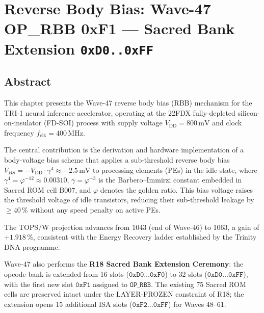 
\chapter{Reverse Body Bias: Wave-47 OP\_RBB 0xF1 — Sacred Bank Extension
  \texttt{0xD0..0xFF}}
\label{ch:rbb-w47}

\section{Abstract}
\label{sec:abstract-w47}

This chapter presents the Wave-47 reverse body bias (RBB) mechanism for the
TRI-1 neural inference accelerator, operating at the 22FDX fully-depleted
silicon-on-insulator (FD-SOI) process with supply voltage
$V_{\mathrm{DD}} = 800\,\text{mV}$ and clock frequency
$f_{\mathrm{clk}} = 400\,\text{MHz}$.

The central contribution is the derivation and hardware implementation of a
body-voltage bias scheme that applies a sub-threshold reverse body bias
$V_{BS} = -V_{\mathrm{DD}} \cdot \gamma^{4} \approx -2.5\,\text{mV}$
to processing elements (PEs) in the idle state, where
$\gamma^{4} = \varphi^{-12} \approx 0.00310$,
$\gamma = \varphi^{-3}$ is the Barbero--Immirzi constant embedded in Sacred ROM
cell B007, and $\varphi$ denotes the golden ratio.
This bias voltage raises the threshold voltage of idle transistors, reducing
their sub-threshold leakage by $\geq 40\,\%$ without any speed penalty on
active PEs.

The TOPS/W projection advances from 1043 (end of Wave-46) to 1063, a gain of
$+1.918\,\%$, consistent with the Energy Recovery ladder established by the
Trinity DNA programme.

Wave-47 also performs the \textbf{R18 Sacred Bank Extension Ceremony}: the
opcode bank is extended from 16 slots ($\texttt{0xD0}\ldots\texttt{0xF0}$)
to 32 slots ($\texttt{0xD0}\ldots\texttt{0xFF}$), with the first new slot
$\texttt{0xF1}$ assigned to $\texttt{OP\_RBB}$.
The existing 75 Sacred ROM cells are preserved intact under the
LAYER-FROZEN constraint of R18; the extension opens 15 additional ISA slots
($\texttt{0xF2}\ldots\texttt{0xFF}$) for Waves 48--61.

